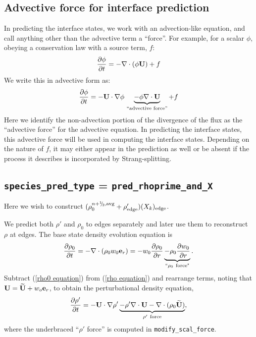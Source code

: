 \subsection{Advective force for interface prediction}
In predicting the interface states, we work with an advection-like
equation, and call anything other than the advective term a ``force''.
For example, for a scalar $\phi$, obeying a conservation law with a source term, $f$:
\begin{equation}
\frac{\partial \phi}{\partial t} = -\nabla \cdot (\phi {\bf U}) + f
\end{equation}
We write this in advective form as:
\begin{equation}
\frac{\partial \phi}{\partial t} = -{\bf U} \cdot \nabla \phi \, \underbrace{- \phi \nabla \cdot {\bf U}}_{\text{``advective force''}} + f
\end{equation}
Here we identify the non-advection portion of the divergence of the
flux as the ``advective force'' for the
advective equation.  In predicting the interface states, this advective
force will be used in computing the interface states.  Depending on the
nature of $f$, it may either appear in the prediction as well or be absent
if the process it describes is incorporated by Strang-splitting.

\subsection{{\tt species\_pred\_type} = {\tt pred\_rhoprime\_and\_X}}

Here we wish to construct $(\rho_0^{n+\myhalf,{\rm avg}}        
+ \rho'_\mathrm{edge})(X_k)_\mathrm{edge}$.

We predict both $\rho'$ and $\rho_0$ to edges separately and later use them to 
reconstruct $\rho$ at edges.  The base state density evolution equation is
\begin{equation}
\frac{\partial\rho_0}{\partial t} = -\nabla\cdot(\rho_0 w_0 {\bf e}_r) = 
-w_0\frac{\partial\rho_0}{\partial r} 
\underbrace{-\rho_0\frac{\partial w_0}{\partial r}}_{``\rho_0 ~ \text{force"}}.
\label{rho0 equation}
\end{equation}
Subtract (\ref{rho0 equation}) from (\ref{rho equation}) and rearrange
terms, noting that ${\bf U} = \widetilde{{\bf U}} + w_o{\bf e}_r$, to obtain the
perturbational density equation,
\begin{equation}
\frac{\partial\rho'}{\partial t} = -{\bf U}\cdot\nabla\rho' \underbrace{- \rho'\nabla\cdot{\bf U} 
- \nabla\cdot(\rho_0\widetilde{{\bf U}})}_{\rho' ~ \text{force}},
\label{rhoprime equation}
\end{equation}
where the underbraced ``$\rho'$ force'' is computed in {\tt modify\_scal\_force}.

